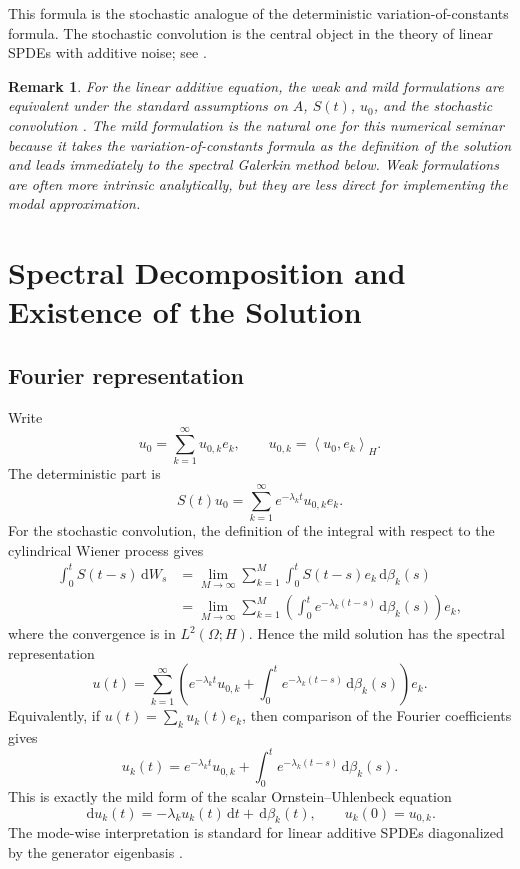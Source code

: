 \documentclass[11pt,a4paper]{article}
\newtheorem{remark}[theorem]{Remark}
\newcommand{\dd}{\,\mathrm{d}}
\newcommand{\ip}[2]{\left\langle #1,#2 \right\rangle}
\begin{document}
This formula is the stochastic analogue of the deterministic
variation-of-constants formula. The stochastic convolution is the central object
in the theory of linear SPDEs with additive noise; see \cite{delSarto2025}.

\begin{remark}
For the linear additive equation, the weak and mild formulations are
equivalent under the standard assumptions on \(A\), \(S(t)\), \(u_0\), and the
stochastic convolution \cite{daPratoZabczyk,delSarto2025}. The mild
formulation is the natural one for this numerical seminar because it takes the
variation-of-constants formula as the definition of the solution and leads
immediately to the spectral Galerkin method below. Weak formulations are often
more intrinsic analytically, but they are less direct for implementing the
modal approximation.
\end{remark}

\section{Spectral Decomposition and Existence of the Solution}

\subsection{Fourier representation}

Write
\[
  u_0=\sum_{k=1}^{\infty}u_{0,k}e_k,
  \qquad
  u_{0,k}=\ip{u_0}{e_k}_H.
\]
The deterministic part is
\[
  S(t)u_0
  =
  \sum_{k=1}^{\infty}e^{-\lambda_k t}u_{0,k}e_k.
\]
For the stochastic convolution, the definition of the integral with respect to
the cylindrical Wiener process gives
\[
\begin{aligned}
  \int_0^t S(t-s)\dd W_s
  &=
  \lim_{M\to\infty}
  \sum_{k=1}^{M}
  \int_0^t S(t-s)e_k\dd\beta_k(s)  \\
  &=
  \lim_{M\to\infty}
  \sum_{k=1}^{M}
  \left(\int_0^t e^{-\lambda_k(t-s)}\dd\beta_k(s)\right)e_k,
\end{aligned}
\]
where the convergence is in \(L^2(\Omega;H)\). Hence the mild solution has the
spectral representation
\[
  u(t)
  =
  \sum_{k=1}^{\infty}
  \left(
    e^{-\lambda_k t}u_{0,k}
    +
    \int_0^t e^{-\lambda_k(t-s)}\dd\beta_k(s)
  \right)e_k.
\]
Equivalently, if \(u(t)=\sum_k u_k(t)e_k\), then comparison of the Fourier
coefficients gives
\[
  u_k(t)
  =
  e^{-\lambda_k t}u_{0,k}
  +
  \int_0^t e^{-\lambda_k(t-s)}\dd\beta_k(s).
\]
This is exactly the mild form of the scalar Ornstein--Uhlenbeck equation
\[
  \dd u_k(t)=-\lambda_k u_k(t)\dd t+\dd\beta_k(t),
  \qquad u_k(0)=u_{0,k}.
\]
The mode-wise interpretation is standard for linear additive SPDEs diagonalized
by the generator eigenbasis \cite{delSarto2025,lordPowellShardlow}.
\end{document}
